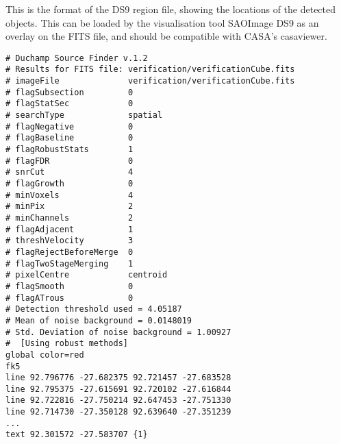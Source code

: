 %
%
%
%
\label{app-karma}

This is the format of the DS9 region file, showing the locations
of the detected objects. This can be loaded by the visualisation tool
SAOImage DS9 as an overlay on the FITS file, and should be compatible
with CASA's casaviewer.

\begin{verbatim}
# Duchamp Source Finder v.1.2
# Results for FITS file: verification/verificationCube.fits
# imageFile              verification/verificationCube.fits
# flagSubsection         0
# flagStatSec            0
# searchType             spatial
# flagNegative           0
# flagBaseline           0
# flagRobustStats        1
# flagFDR                0
# snrCut                 4
# flagGrowth             0
# minVoxels              4
# minPix                 2
# minChannels            2
# flagAdjacent           1
# threshVelocity         3
# flagRejectBeforeMerge  0
# flagTwoStageMerging    1
# pixelCentre            centroid
# flagSmooth             0
# flagATrous             0
# Detection threshold used = 4.05187
# Mean of noise background = 0.0148019
# Std. Deviation of noise background = 1.00927
#  [Using robust methods]
global color=red 
fk5
line 92.796776 -27.682375 92.721457 -27.683528
line 92.795375 -27.615691 92.720102 -27.616844
line 92.722816 -27.750214 92.647453 -27.751330
line 92.714730 -27.350128 92.639640 -27.351239
...
text 92.301572 -27.583707 {1}
\end{verbatim}

